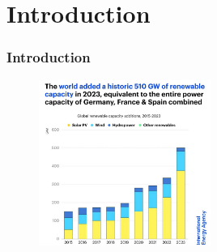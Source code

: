 \documentclass[aspectratio=169]{beamer}
\subtitle{\vspace{-3em}Quantifying Integration Costs of Variable Renewable Energy Technologies in European Energy Systems}
\author{Muhammad Umair Tareen, Sylvain Quoilin}
\institute{University of Liège}
\date{ECOS, Paris - June 30, 2025}
\begin{document}
\titleframe





\section{Introduction}

\begin{frame}{\insertsectionhead}
  \frametitle{Introduction}
  \begin{figure}
    \centering
    \includegraphics[width=0.5\textwidth]{global.png}
  \end{figure}
\end{frame}
\end{document}

